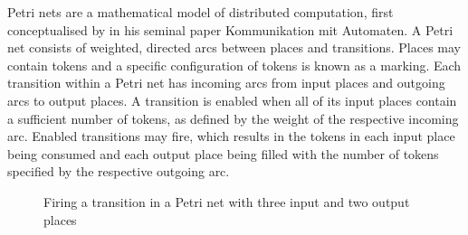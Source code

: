 \documentclass[../../Dissertation.tex]{subfiles}
\begin{document}
Petri nets are a mathematical model of distributed computation, first conceptualised by   in his seminal paper Kommunikation mit Automaten. A Petri net consists of weighted, directed arcs between places and transitions. Places may contain tokens and a specific configuration of tokens is known as a marking. Each transition within a Petri net has incoming arcs from input places and outgoing arcs to output places. A transition is enabled when all of its input places contain a sufficient number of tokens, as defined by the weight of the respective incoming arc. Enabled transitions may fire, which results in the tokens in each input place being consumed and each output place being filled with the number of tokens specified by the respective outgoing arc.
\begin{figure}[H]
  \begin{center}
  \end{center}
  \caption{Firing a transition in a Petri net with three input and two output places}
  \label{fig:PetriNet}
\end{figure}
\end{document}
